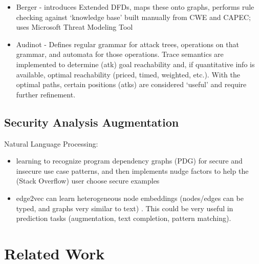\documentclass[11pt]{article}
\begin{document}
\begin{itemize}
    
    \item Berger - introduces Extended DFDs, maps these onto graphs, performs rule checking against ‘knowledge base’ built manually from CWE and CAPEC; uses Microsoft Threat Modeling Tool \cite{berger2016automatically}
    
    \item Audinot - Defines regular grammar for attack trees, operations on that grammar, and automata for those operations.  Trace semantics are implemented to determine (atk) goal reachability and, if quantitative info is available, optimal reachability (priced, timed, weighted, etc.).  With the optimal paths, certain positions (atks) are considered ‘useful’ and require further refinement. \cite{audinot2018guided}
    
\end{itemize}

\subsection{Security Analysis Augmentation}

Natural Language Processing:

\begin{itemize}
        
    \item learning to recognize program dependency graphs (PDG) for secure and insecure use case patterns, and then implements nudge factors to help the (Stack Overflow) user choose secure examples \cite{fischer2019stack}
        
    \item edge2vec can learn heterogeneous node embeddings (nodes/edges can be typed, and graphs very similar to text) \cite{gao2018edge2vec}.  This could be very useful in prediction tasks (augmentation, text completion, pattern matching).
        
\end{itemize}

\section{Related Work}
\end{document}
